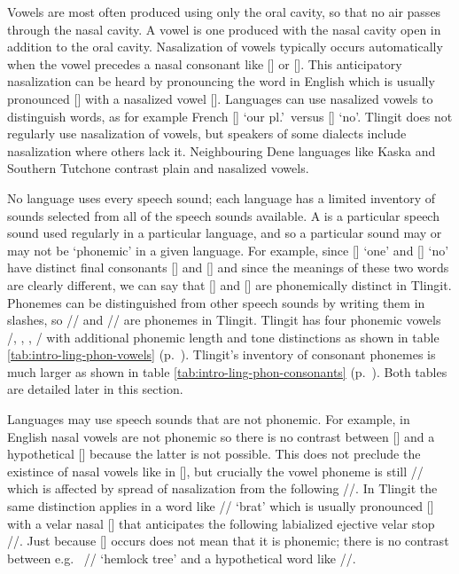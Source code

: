 Vowels are most often produced using only the oral cavity, so that no air passes through the nasal cavity. A  vowel is one produced with the nasal cavity open in addition to the oral cavity. Nasalization of vowels typically occurs automatically when the vowel precedes a nasal consonant like [] or []. This anticipatory nasalization can be heard by pronouncing the word  in English which is usually pronounced [] with a nasalized vowel []. Languages can use nasalized vowels to distinguish words, as for example French  [] ‘our pl.’\ versus  [] ‘no’. Tlingit does not regularly use nasalization of vowels, but speakers of some dialects include nasalization where others lack it. Neighbouring Dene languages like Kaska and Southern Tutchone contrast plain and nasalized vowels.

No language uses every speech sound; each language has a limited inventory of sounds selected from all of the speech sounds available. A  is a particular speech sound used regularly in a particular language, and so a particular sound may or may not be ‘phonemic’ in a given language. For example, since  [] ‘one’ and  [] ‘no’ have distinct final consonants [] and [] and since the meanings of these two words are clearly different, we can say that [] and [] are phonemically distinct in Tlingit. Phonemes can be distinguished from other speech sounds by writing them in slashes, so // and // are phonemes in Tlingit. Tlingit has four phonemic vowels /, , , / with additional phonemic length and tone distinctions as shown in table \ref{tab:intro-ling-phon-vowels} (p.\ \pageref{tab:intro-ling-phon-vowels}). Tlingit’s inventory of consonant phonemes is much larger as shown in table \ref{tab:intro-ling-phon-consonants} (p.\ \pageref{tab:intro-ling-phon-consonants}). Both tables are detailed later in this section.

Languages may use speech sounds that are not phonemic. For example, in English nasal vowels are not phonemic so there is no contrast between  [] and a hypothetical  [] because the latter is not possible. This does not preclude the existince of nasal vowels like in  [], but crucially the vowel phoneme is still // which is affected by spread of nasalization from the following //. In Tlingit the same distinction applies in a word like  // ‘brat’ which is usually pronounced [] with a velar nasal [] that anticipates the following labialized ejective velar stop //. Just because [] occurs does not mean that it is phonemic; there is no contrast between e.g.\  // ‘hemlock tree’ and a hypothetical word like  //.

